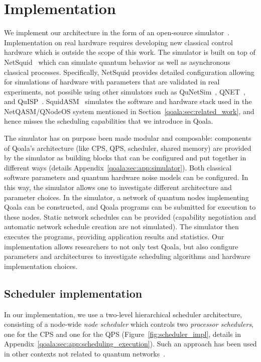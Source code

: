 \section{Implementation}
\label{qoala:sec:implementation}
We implement our architecture in the form of an open-source simulator~\cite{qoala2023simulator}.
Implementation on real hardware requires developing new classical control hardware which is outside the scope of this work.
The simulator is built on top of NetSquid~\cite{coopmans2021netsquid} which can simulate quantum behavior as well as asynchronous classical processes.
Specifically, NetSquid provides detailed configuration allowing for simulations of hardware with parameters that are validated in real experiments, not possible using other simulators such as QuNetSim~\cite{diadamo2021qunetsim}, QNET~\cite{QNET}, and QuISP~\cite{satoh2022quisp}.
SquidASM~\cite{squidasmrepo} simulates the software and hardware stack used in the NetQASM/QNodeOS system mentioned in Section~\ref{qoala:sec:related_work}, and hence misses the scheduling capabilities that we introduce in Qoala.

The simulator has on purpose been made modular and composable:
components of Qoala's architecture (like CPS, QPS, scheduler, shared memory) are provided by the simulator as building blocks that can be configured and put together in different ways (details Appendix~\ref{qoala:sec:app:simulator}).
Both classical software parameters and quantum hardware noise models can be configured.
In this way, the simulator allows one to investigate different architecture and parameter choices.
In the simulator, a network of quantum nodes implementing Qoala can be constructed, and Qoala programs can be submitted for execution to these nodes.
Static network schedules can be provided (capability negotiation and automatic network schedule creation are not simulated).
The simulator then executes the programs, providing application results and statistics.
Our implementation allows researchers to not only test Qoala, but also configure parameters and architectures to investigate scheduling algorithms and hardware implementation choices.

\subsection{Scheduler implementation}
In our implementation, we use a two-level hierarchical scheduler architecture,
consisting of a node-wide \textit{node scheduler} which controls two \textit{processor schedulers}, one for the CPS and one for the QPS (Figure~\ref{fig:scheduler_impl}, details in Appendix~\ref{qoala:sec:app:scheduling_execution}).
Such an approach has been used in other contexts not related to quantum networks~\cite{polychronopoulos1991hierarchical, girkar1994hierarchical}.


